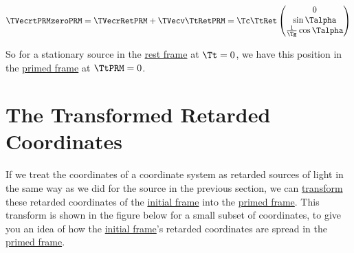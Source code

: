 \begin{equation}
	\label{eq: primed position with synced times}
	\TVecrtPRMzeroPRM  = \TVecrRetPRM  + \TVecv \TtRetPRM  = {\Tc }{ \TtRet  }
	\begin{pmatrix}
		0                               \\
		\sin{\Talpha }                    \\
		\frac{1}{ \Tg  } \cos{\Talpha } \\
	\end{pmatrix}
\end{equation}

So for a stationary source in the \hyperlink{def-proper-frame}{rest frame} at $\Tt =0$, we have this position in the \hyperlink{def-Primed-Frame}{primed frame} at $\TtPRM =0$.

\section{The Transformed Retarded Coordinates} \label{sect: Delayed View of Transformed Coordinates}

If we treat the coordinates of a coordinate system as retarded sources of light in the same way as we did for the source in the previous section, we can \hyperlink{def-transform}{transform} these retarded coordinates of the \hyperlink{def-initial-Frame}{initial frame} into the \hyperlink{def-Primed-Frame}{primed frame}.
This transform is shown in the figure below for a small subset of coordinates, to give you an idea of how the \hyperlink{def-initial-Frame}{initial frame}'s retarded coordinates are spread in the \hyperlink{def-Primed-Frame}{primed frame}.

